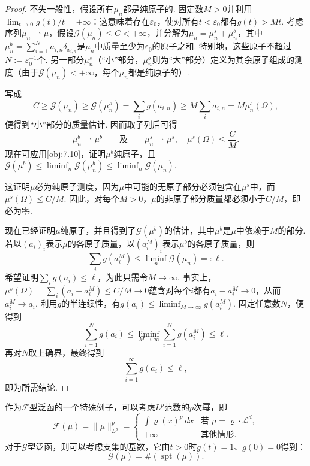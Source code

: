 \begin{proof}
不失一般性，假设所有$\mu_n$都是纯原子的. 固定数$M>0$并利用$\lim_{t\to0}g(t)/t=+\infty$：这意味着存在$\varepsilon_0$，使对所有$t<\varepsilon_0$都有$g(t)>Mt$. 考虑序列$\mu_n\rightharpoonup\mu$，假设$\mathscr G(\mu_n)\leq C<+\infty$，并分解为$\mu_n=\mu_n^s+\mu_n^b$，其中$\mu_n^b=\sum_{i=1}^Na_{i,n}\delta_{x_{i,n}}$是$\mu_n$中质量至少为$\varepsilon_0$的原子之和. 特别地，这些原子不超过$N:=\varepsilon_0^{-1}$个. 另一部分$\mu_n^s$（“小”部分，$\mu_n^b$则为“大”部分）定义为其余原子组成的测度（由于$\mathscr G(\mu_n)<+\infty$，每个$\mu_n$都是纯原子的）.

写成
\[
 C\geq\mathscr G(\mu_n)\geq\mathscr G(\mu_n^s)
   =\sum_i g(a_{i,n})\geq M\sum_i a_{i,n}=M\mu_n^s(\Omega),
\]
便得到“小”部分的质量估计. 因而取子列后可得
\[
 \mu_n^b\rightharpoonup\mu^b\qquad\text{及}\qquad
 \mu_n^s\rightharpoonup\mu^s,\quad\mu^s(\Omega)\leq\frac CM.
\]
现在可应用\autoref{obj:7.10}，证明$\mu^b$纯原子，且$\mathscr G(\mu^b)\leq\liminf_n\mathscr G(\mu_n^b)\leq\liminf_n\mathscr G(\mu_n)$.

这证明$\mu$必为纯原子测度，因为$\mu$中可能的无原子部分必须包含在$\mu^s$中，而$\mu^s(\Omega)\leq C/M$. 因此，对每个$M>0$，$\mu$的非原子部分质量都必须小于$C/M$，即必为零.

现在已经证明$\mu$纯原子，并且得到了$\mathscr G(\mu^b)$的估计，其中$\mu^b$是$\mu$中依赖于$M$的部分. 若以$(a_i)_i$表示$\mu$的各原子质量，以$(a_i^M)_i$表示$\mu^b$的各原子质量，则
\[
 \sum_i g(a_i^M)\leq\liminf_n\mathscr G(\mu_n)=:\ell.
\]
希望证明$\sum_i g(a_i)\leq\ell$，为此只需令$M\to\infty$. 事实上，$\mu^s(\Omega)=\sum_i(a_i-a_i^M)\leq C/M\to0$蕴含对每个$i$都有$a_i-a_i^M\to0$，从而$a_i^M\to a_i$. 利用$g$的半连续性，有$g(a_i)\leq\liminf_{M\to\infty}g(a_i^M)$. 固定任意数$N$，便得到
\[
 \sum_{i=1}^Ng(a_i)\leq\liminf_{M\to\infty}\sum_{i=1}^Ng(a_i^M)\leq\ell.
\]
再对$N$取上确界，最终得到
\[
 \sum_{i=1}^\infty g(a_i)\leq\ell,
\]
即为所需结论.
\end{proof}
作为$\mathscr F$型泛函的一个特殊例子，可以考虑$L^p$范数的$p$次幂，即
\[
 \mathscr F(\mu)=\|\mu\|_{L^p}^p=\begin{cases}
 \displaystyle\int\varrho(x)^p\,dx&\text{若 }\mu=\varrho\cdot\mathscr L^d,\\
 +\infty&\text{其他情形}.
 \end{cases}
\]
对于$\mathscr G$型泛函，则可以考虑支集的基数，它由$t>0$时$g(t)=1$、$g(0)=0$得到：
\[
 \mathscr G(\mu)=\#(\operatorname{spt}(\mu)).
\]

